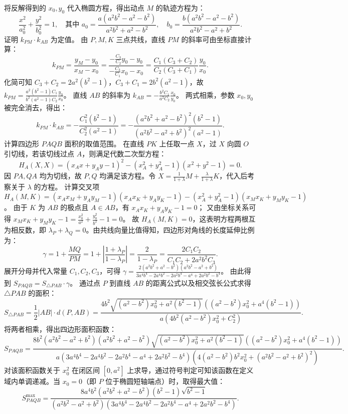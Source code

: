 \begin{solution}
将反解得到的 $x_0, y_0$ 代入椭圆方程，得出动点 $M$ 的轨迹方程为：
\[ \frac{x^2}{a_0^2} + \frac{y^2}{b_0^2} = 1, \quad \text{其中 } a_0 = \frac{a(a^2b^2 - a^2 - b^2)}{a^2b^2 + a^2 - b^2}, \quad b_0 = \frac{b(a^2b^2 - a^2 - b^2)}{a^2b^2 - a^2 + b^2}. \]
证明 $k_{PM} \cdot k_{AB}$ 为定值。
由 $P, M, K$ 三点共线，直线 $PM$ 的斜率可由坐标直接计算：
\[ k_{PM} = \frac{y_M - y_0}{x_M - x_0} = \frac{-\frac{C_3}{C_2}y_0 - y_0}{-\frac{C_3}{C_1}x_0 - x_0} = \frac{C_1(C_3 + C_2)}{C_2(C_3 + C_1)} \frac{y_0}{x_0}. \]
化简可知 $C_3 + C_2 = 2a^2(b^2 - 1)$，$C_3 + C_1 = 2b^2(a^2 - 1)$，故 $k_{PM} = \frac{a^2(b^2-1)C_1}{b^2(a^2-1)C_2} \frac{y_0}{x_0}$。
直线 $AB$ 的斜率为 $k_{AB} = -\frac{b^2 C_1}{a^2 C_2} \frac{x_0}{y_0}$。
两式相乘，参数 $x_0, y_0$ 被完全消去，得出：
\[ k_{PM} \cdot k_{AB} = -\frac{C_1^2 (b^2 - 1)}{C_2^2 (a^2 - 1)} = -\frac{(a^2b^2 + a^2 - b^2)^2(b^2 - 1)}{(a^2b^2 - a^2 + b^2)^2(a^2 - 1)}. \]
计算四边形 $PAQB$ 面积的取值范围。
在直线 $PK$ 上任取一点 $X$，过 $X$ 向圆 $O$ 引切线，若该切线过点 $A$，则满足代数二次型方程：
\[ H_A(X, X) = (x_A x + y_A y - 1)^2 - (x_A^2 + y_A^2 - 1)(x^2 + y^2 - 1) = 0. \]
因 $PA, QA$ 均为切线，故 $P, Q$ 均满足该方程。令 $X = \frac{1}{1+\lambda} M + \frac{\lambda}{1+\lambda} K$，代入后考察关于 $\lambda$ 的方程。
计算交叉项 $H_A(M, K) = (x_A x_M + y_A y_M - 1)(x_A x_K + y_A y_K - 1) - (x_A^2+y_A^2-1)(x_M x_K + y_M y_K - 1)$。
由于 $K$ 为 $AB$ 的极点且 $A \in AB$，有 $x_A x_K + y_A y_K - 1 = 0$；
又由坐标关系可得 $x_M x_K + y_M y_K - 1 = \frac{x_0^2}{a^2} + \frac{y_0^2}{b^2} - 1 = 0$。
故 $H_A(M, K) = 0$，这表明方程两根互为相反数，即 $\lambda_P + \lambda_Q = 0$。由共线向量比值得知，四边形对角线的长度延伸比例为：
\[ \gamma = 1 + \frac{MQ}{PM} = 1 + \left|\frac{1+\lambda_P}{1-\lambda_P}\right| = \frac{2}{1-\lambda_P} = \frac{2C_1 C_2}{C_1 C_2 + 2a^2b^2 C_3}. \]
展开分母并代入常量 $C_1, C_2, C_3$，可得 $\gamma = \frac{2(a^2b^2 + a^2 - b^2)(a^2b^2 - a^2 + b^2)}{3a^4b^4 - 2a^4b^2 - 2a^2b^4 - a^4 + 2a^2b^2 - b^4}$。
由此得到 $S_{PAQB} = S_{\triangle PAB} \cdot \gamma$。
通过点 $P$ 到直线 $AB$ 的距离公式以及相交弦长公式求得 $\triangle PAB$ 的面积：
\[ S_{\triangle PAB} = \frac{1}{2} |AB| \cdot d(P, AB) = \frac{4b^2 \sqrt{(a^2-b^2)x_0^2 + a^2(b^2-1)} \left((a^2-b^2)x_0^2 + a^4(b^2-1)\right)}{a \left(4b^2(a^2-b^2)x_0^2 + C_2^2\right)}. \]
将两者相乘，得出四边形面积函数：
\[ S_{PAQB} = \frac{8b^2(a^2b^2 - a^2 + b^2)(a^2b^2 + a^2 - b^2)\sqrt{(a^2 - b^2)x_0^2 + a^2(b^2 - 1)}\left((a^2 - b^2)x_0^2 + a^4(b^2 - 1)\right)}{a\left(3a^4b^4 - 2a^4b^2 - 2a^2b^4 - a^4 + 2a^2b^2 - b^4\right)\left(4(a^2 - b^2)b^2x_0^2 + (a^2b^2 - a^2 + b^2)^2\right)}. \]
对该面积函数关于 $x_0^2$ 在闭区间 $[0, a^2]$ 上求导，通过符号判定可知该函数在定义域内单调递减。当 $x_0 = 0$（即 $P$ 位于椭圆短轴端点）时，取得最大值：
\[ S_{PAQB}^{\max} = \frac{8a^4b^2(a^2b^2 + a^2 - b^2)(b^2 - 1)\sqrt{b^2 - 1}}{(a^2b^2 - a^2 + b^2)\left(3a^4b^4 - 2a^4b^2 - 2a^2b^4 - a^4 + 2a^2b^2 - b^4\right)}. \]
\end{solution}

